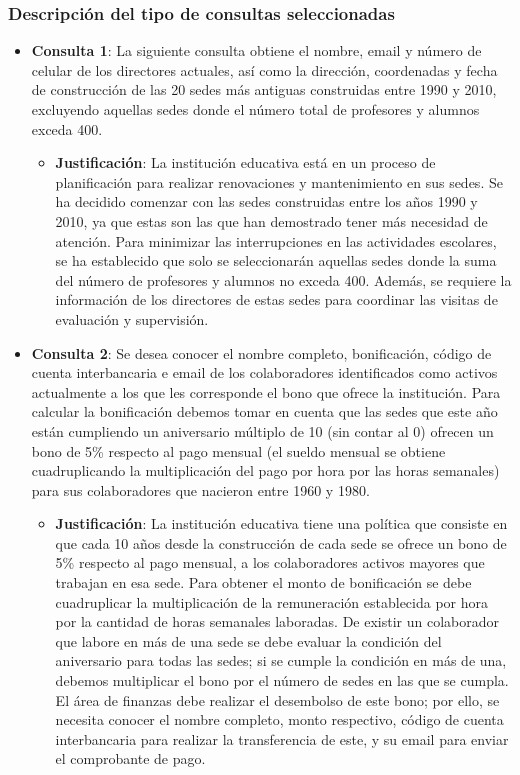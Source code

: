 \subsubsection{Descripción del tipo de consultas seleccionadas}
\begin{itemize}
	\item{\textbf{Consulta 1}: La siguiente consulta obtiene el nombre, email y número de celular de los directores actuales, así como la dirección, coordenadas y fecha de construcción de las 20 sedes más antiguas construidas entre 1990 y 2010, excluyendo aquellas sedes donde el número total de profesores y alumnos exceda 400.}
	      \begin{itemize}
		      \item{\textbf{Justificación}: La institución educativa está en un proceso de planificación para realizar renovaciones y mantenimiento en sus sedes. Se ha decidido comenzar con las sedes construidas entre los años 1990 y 2010, ya que estas son las que han demostrado tener más necesidad de atención. Para minimizar las interrupciones en las actividades escolares, se ha establecido que solo se seleccionarán aquellas sedes donde la suma del número de profesores y alumnos no exceda 400. Además, se requiere la información de los directores de estas sedes para coordinar las visitas de evaluación y supervisión.}
	      \end{itemize}
	\item{\textbf{Consulta 2}: Se desea conocer el nombre completo, bonificación, código de cuenta interbancaria e email de los colaboradores identificados como activos actualmente a los que les corresponde el bono que ofrece la institución. Para calcular la bonificación debemos tomar en cuenta que las sedes que este año están cumpliendo un aniversario múltiplo de 10 (sin contar al 0) ofrecen un bono de 5\% respecto al pago mensual (el sueldo mensual se obtiene cuadruplicando la multiplicación del pago por hora por las horas semanales) para sus colaboradores que nacieron entre 1960 y 1980.}
	      \begin{itemize}
		      \item{\textbf{Justificación}: La institución educativa tiene una política que consiste en que cada 10 años desde la construcción de cada sede se ofrece un bono de 5\% respecto al pago mensual, a los colaboradores activos mayores que trabajan en esa sede. Para obtener el monto de bonificación se debe cuadruplicar la multiplicación de la remuneración establecida por hora por la cantidad de horas semanales laboradas. De existir un colaborador que labore en más de una sede se debe evaluar la condición del aniversario para todas las sedes; si se cumple la condición en más de una, debemos multiplicar el bono por el número de sedes en las que se cumpla. El área de finanzas debe realizar el desembolso de este bono; por ello, se necesita conocer el nombre completo, monto respectivo, código de cuenta interbancaria para realizar la transferencia de este, y su email para enviar el comprobante de pago.}

\end{itemize}
\end{itemize}
